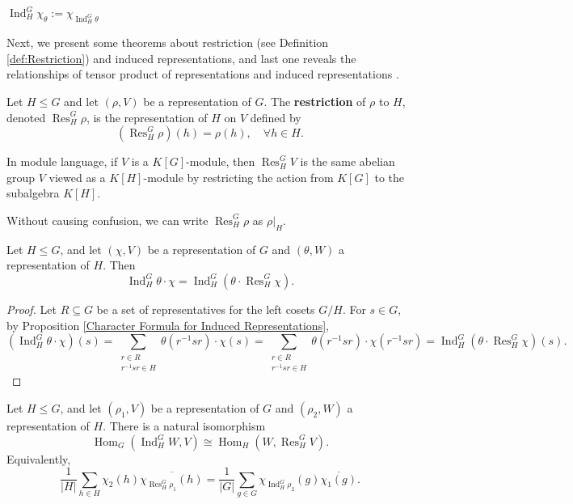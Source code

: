 \begin{notation}
$\operatorname{Ind}_H^G \chi_\theta:=\chi_{\operatorname{Ind}_H^G \theta} $
\end{notation}

Next, we present some theorems about restriction (see Definition \ref{def:Restriction}) and induced representations, and last one reveals the relationships of tensor product of representations and induced representations .

\begin{defn}[Restriction]
\label{def:Restriction}
Let \(H \le G\) and let \((\rho, V)\) be a representation of \(G\). 
The \textbf{restriction} of \(\rho\) to \(H\), denoted \(\operatorname{Res}_H^G \rho\), is the representation of \(H\) on \(V\) defined by
\[
(\operatorname{Res}_H^G \rho)(h) = \rho(h), \quad \forall h \in H.
\]

In module language, if \(V\) is a \(K[G]\)-module, then \(\operatorname{Res}_H^G V\) is the same abelian group \(V\) viewed as a \(K[H]\)-module by restricting the action from \(K[G]\) to the subalgebra \(K[H]\).

Without causing confusion, we can write $\operatorname{Res}_H^G \rho$ as $\rho|_H$.
\end{defn}
\begin{prop}
\label{prop:ind eq ind res}
Let \(H \le G\), and let \((\chi,V)\) be a representation of $G$ and \((\theta,W)\) a representation of $H$. Then
\[
\operatorname{Ind}_H^G \theta \cdot \chi = \operatorname{Ind}_H^G (\theta \cdot \operatorname{Res}_H^G \chi).
\]
\end{prop}

\begin{proof}
Let \(R \subseteq G\) be a set of representatives for the left cosets \(G/H\). For \(s \in G\), by Proposition \ref{Character Formula for Induced Representations},
\[
(\operatorname{Ind}_H^G \theta \cdot \chi)(s)
= \sum_{\substack{r \in R \\ r^{-1}sr \in H}} \theta(r^{-1}sr) \cdot \chi(s)
= \sum_{\substack{r \in R \\ r^{-1}sr \in H}} \theta(r^{-1}sr) \cdot \chi(r^{-1}sr)
= \operatorname{Ind}_H^G (\theta \cdot \operatorname{Res}_H^G \chi)(s).
\]
\end{proof}
\begin{thm}\label{Frobenius Reciprocity}
Let \(H \le G\), and let \((\rho_1,V)\) be a representation of $G$ and \((\rho_2,W)\) a representation of $H$. There is a natural isomorphism
\[
\operatorname{Hom}_G(\operatorname{Ind}_H^G W, V) \cong \operatorname{Hom}_H(W, \operatorname{Res}_H^G V).
\]
Equivalently,
\[
\frac{1}{|H|} \sum_{h \in H} \chi_2(h) \overline{\chi_{\operatorname{Res}_H^G \rho_1}(h)}
=
\frac{1}{|G|} \sum_{g \in G} \chi_{\operatorname{Ind}_H^G \rho_2}(g) \overline{\chi_1(g)}.
\]
\end{thm}

